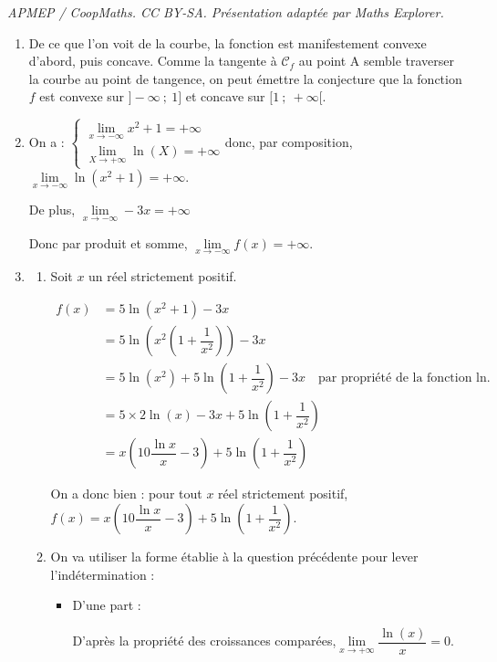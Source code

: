 \documentclass[10pt]{article}
\begin{document}
\noindent\textit{APMEP / CoopMaths. CC BY-SA. Présentation adaptée par Maths Explorer.}\par\medskip
\begin{enumerate}
\item De ce que l'on voit de la courbe, la fonction est manifestement convexe d'abord, puis concave. Comme la tangente à $\mathcal{C}_f$ au point A semble traverser la courbe au point de tangence, on peut émettre la conjecture que la fonction $f$ est convexe sur $]-\infty~;~1]$ et concave sur $[1~;~+\infty[$.
\item On a :
\quad $ \begin{cases} \lim\limits_{x \to -\infty } x^2+1 = +\infty \\
\lim\limits_{X \to +\infty } \ln(X) = +\infty \end{cases} $\quad donc, par composition, \quad $ \lim\limits_{x \to -\infty} \ln (x^2+1) = +\infty$.

De plus, \quad $\lim\limits_{x \to -\infty} -3x = +\infty$

Donc par produit et somme, \quad $\lim\limits_{x \to -\infty} f(x) = +\infty$.
\item 
	\begin{enumerate}
		\item Soit $x$ un réel strictement positif.

$\begin{aligned} f(x) &= 5 \ln \left(x^{2}+1\right)-3 x\\
	&= 5 \ln \left(x^{2} \left(1 + \dfrac{1}{x^2}\right)\right)-3 x \\
	&= 5\ln \left(x^2 \right) + 5 \ln \left(1+\dfrac{1}{x^{2}}\right) -3x\quad \text{par propriété de la fonction ln}.\\
	&= 5 \times 2 \ln(x) -3x + 5 \ln \left(1+\dfrac{1}{x^{2}}\right) \\
	&= x\left(10 \dfrac{\ln x}{x}-3\right)+5 \ln \left(1+\dfrac{1}{x^{2}}\right)
\end{aligned}$

On a donc bien : pour tout $x$ réel strictement positif,\quad $f(x)=x\left(10 \dfrac{\ln x}{x}-3\right)+5 \ln \left(1+\dfrac{1}{x^{2}}\right)$.
		\item On va utiliser la forme établie à la question précédente pour lever l'indétermination :
		\begin{itemize}
			\item D'une part :

D'après la propriété des croissances comparées,\quad $\lim\limits_{x\to +\infty} \dfrac{\ln(x)}{x} = 0$.


\end{itemize}
\end{enumerate}
\end{enumerate}
\end{document}
